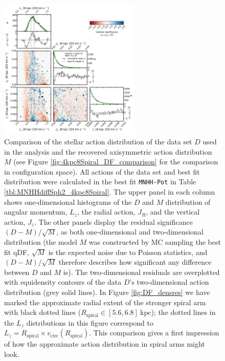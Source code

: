 \documentclass[iop,revtex4,numberedappendix,appendixfloats]{emulateapj}
\begin{document}
\begin{figure}[!htbp]
\centering
\includegraphics[width=0.6\textwidth]{fig/MNdHHdiffSph2_4kpc8Spiral_a_data_bestfit_residuals_only_actions.pdf}
\caption{Comparison of the stellar action distribution of the data set $D$ used in the analysis and the recovered axisymmetric action distribution $M$ (see Figure \ref{fig:4kpc8Spiral_DF_comparison} for the comparison in configuration space). All actions of the data set and best fit distribution were calculated in the best fit \texttt{MNHH-Pot} in Table \ref{tbl:MNHHdiffSph2_4kpc8Spiral}. The upper panel in each column shows one-dimensional histograms of the $D$ and $M$ distribution of angular momentum, $L_z$, the radial action, $J_R$, and the vertical action, $J_z$. The other panels display the residual significance $(D-M)/\sqrt{M}$, as both one-dimensional and two-dimensional distribution (the model $M$ was constructed by MC sampling the best fit qDF, $\sqrt{M}$ is the expected noise due to Poisson statistics, and $(D-M)/\sqrt{M}$ therefore describes how significant any difference between $D$ and $M$ is). The two-dimensional residuals are overplotted with equidensity contours of the data $D$'s two-dimensional action distribution (grey solid lines). In Figure \ref{fig:DF_densres} we have marked the approximate radial extent of the stronger spiral arm with black dotted lines ($R_\text{spiral} \in [5.6,6.8]~\text{kpc}$); the dotted lines in the $L_z$ distributions in this figure correspond to $L_z = R_\text{spiral} \times v_\text{circ}(R_\text{spiral})$. This comparison gives a first impression of how the approximate action distribution in spiral arms might look.}
\label{fig:4kpc8Spiral_actions}
\end{figure}
\end{document}
